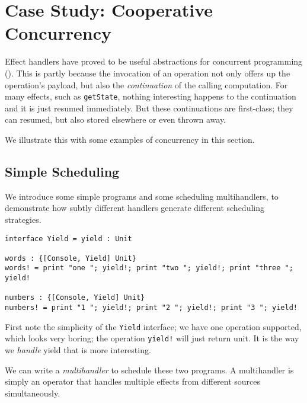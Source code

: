 \documentclass[msc,deptreport,cs]{infthesis} %
\newcommand{\code}[1]{\lstinline{#1}}
\newcommand{\todo}[1]
           {{\par\noindent\small\color{RoyalPurple}
  \framebox{\parbox{\dimexpr\linewidth-2\fboxsep-2\fboxrule}
    {\textbf{TODO:} #1}}}}
\begin{document}
\section{Case Study: Cooperative Concurrency}
\label{sec:concurrency}


Effect handlers have proved to be useful abstractions for concurrent programming
(\cite{dolan2015effective, dolan2017concurrent, hillerstrom2016compilation}).
This is partly because the invocation of an operation not only offers up the
operation's payload, but also the \emph{continuation} of the calling
computation. For many effects, such as \code{getState}, nothing interesting
happens to the continuation and it is just resumed immediately. But these
continuations are first-class; they can resumed, but also stored elsewhere or
even thrown away.

We illustrate this with some examples of concurrency in this section.

%

\subsection{Simple Scheduling}
\label{subsec:simple-scheduling}

We introduce some simple programs and some scheduling multihandlers, to
demonstrate how subtly different handlers generate different scheduling
strategies.

\begin{lstlisting}
interface Yield = yield : Unit

words : {[Console, Yield] Unit}
words! = print "one "; yield!; print "two "; yield!; print "three "; yield!

numbers : {[Console, Yield] Unit}
numbers! = print "1 "; yield!; print "2 "; yield!; print "3 "; yield!
\end{lstlisting}

First note the simplicity of the \code{Yield} interface; we have one operation
supported, which looks very boring; the operation \code{yield!} will just return
unit. It is the way we \emph{handle} yield that is more interesting.

We can write a \emph{multihandler} to schedule these two programs. A
multihandler is simply an operator that handles multiple effects from different
sources simultaneously.
\end{document}
